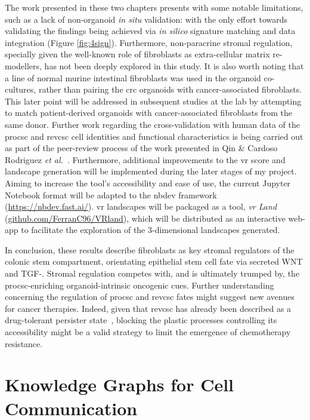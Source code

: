 The work presented in these two chapters presents with some notable limitations, such as a lack of non-organoid \emph{in situ} validation: with the only effort towards validating the findings being achieved via \emph{in silico} signature matching and data integration (Figure \ref{fig:4sign}). Furthermore, non-paracrine stromal regulation, specially given the well-known role of fibroblasts as extra-cellular matrix re-modellers, has not been deeply explored in this study. It is also worth noting that a line of normal murine intestinal fibroblasts was used in the organoid co-cultures, rather than pairing the \acrshort{crc} organoids with cancer-associated fibroblasts. 
This later point will be addressed in subsequent studies at the lab by attempting to match patient-derived organoids with cancer-associated fibroblasts from the same donor. Further work regarding the cross-validation with human data of the \acrshort{procsc} and \acrshort{revcsc} cell identities and functional characteristics is being carried out as part of the peer-review process of the work presented in Qin \& Cardoso Rodriguez \emph{et al.}~\cite{cardoso_rodriguez_single-cell_2023}. Furthermore, additional improvements to the \acrshort{vr} score and landscape generation will be implemented during the later stages of my project. Aiming to increase the tool's accessibility and ease of use, the current Jupyter Notebook format will be adapted to the nbdev framework (\url{https://nbdev.fast.ai/}). \acrshort{vr} landscapes will be packaged as a tool, \emph{\acrshort{vr} Land} (\url{github.com/FerranC96/VRland}), which will be distributed as an interactive web-app to facilitate the exploration of the 3-dimensional landscapes generated.

In conclusion, these results describe fibroblasts as key stromal regulators of the colonic stem compartment, orientating epithelial stem cell fate via secreted WNT and TGF-\textbeta\hspace{0.1cm}. Stromal regulation competes with, and is ultimately trumped by, the \acrshort{procsc}-enriching organoid-intrinsic oncogenic cues. Further understanding concerning the regulation of \acrshort{procsc} and \acrshort{revcsc} fates might suggest new avenues for cancer therapies. Indeed, given that \acrshort{revcsc} has already been described as a drug-tolerant persister state~\cite{alvarez-varela_mex3a_2022}, blocking the plastic processes controlling its accessibility might be a valid strategy to limit the emergence of chemotherapy resistance. 


\newpage
\section{Knowledge Graphs for Cell Communication}

